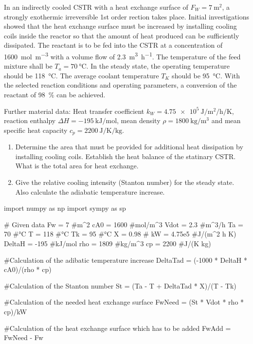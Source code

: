 \begin{question}
In an indirectly cooled CSTR with a heat exchange surface of $F_W = \SI{7}{\square\meter}$, a strongly exothermic irreversible 1st order rection takes place. Initial investigations showed that the heat exchange surface must be increased by installing cooling coils inside the reactor so that the amount of heat produced can be sufficiently dissipated. The reactant is to be fed into the CSTR at a concentration of \SI{1600}{\mole\per\cubic\meter} with a volume flow of \SI{2.3}{\cubic\meter\per\hour}. The temperature of the feed mixture shall be $T_a = \SI{70}{\celsius}$. In the steady state, the operating temperature should be \SI{118}{\celsius}. The average coolant temperature $T_K$ should be \SI{95}{\celsius}. With the selected reaction conditions and operating parameters, a conversion of the reactant of \SI{98}{\percent} can be achieved. 

Further material data: Heat transfer coefficient $k_W = \SI{4. 75e5}{\joule\per\square\meter\per\hour\per\kelvin}$, reaction enthalpy $\Delta H = \SI{-195}{\kilo\joule\per\mole}$, mean density $\rho = \SI{1800}{\kilo\gram\per\cubic\meter}$ and mean specific heat capacity $c_p = \SI{2200}{\joule\per\kelvin\per\kilo\gram}$.
%
\renewcommand{\labelenumi}{\alph{enumi})}
\begin{enumerate}
\item Determine the area that must be provided for additional heat dissipation by installing cooling coils. Establish the heat balance of the statinary CSTR. What is the total area for heat exchange.
\item Give the relative cooling intensity (Stanton number) for the steady state. Also calculate the adiabatic temperature increase.
\end{enumerate}
\end{question}
\begin{pycode}
import numpy as np
import sympy as sp

# Given data
Fw = 7 #m^2
cA0 = 1600 #mol/m^3
Vdot = 2.3 #m^3/h
Ta = 70 #°C
T = 118 #°C
Tk = 95 #°C
X = 0.98 #%
kW = 4.75e5 #J/(m^2 h K)
DeltaH = -195 #kJ/mol
rho = 1809 #kg/m^3
cp = 2200 #J/(K kg)

#Calculation of the adibatic temperature increase
DeltaTad = (-1000 * DeltaH * cA0)/(rho * cp)

#Calculation of the Stanton number
St = (Ta - T + DeltaTad * X)/(T - Tk)

#Calculation of the needed heat exchange surface
FwNeed = (St * Vdot * rho * cp)/kW

#Calculation of the heat exchange surface which has to be added
FwAdd = FwNeed - Fw

\end{pycode}

